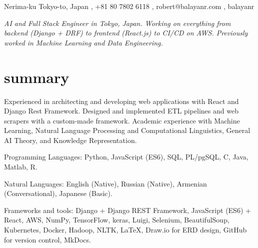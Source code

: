 \documentclass[]{cv-roald}
\begin{document}
\pagestyle{empty} %

{
\faMapMarker \hspace{\FAspace} Nerima-ku Tokyo-to, Japan \sep 
\faMobile \hspace{\FAspace} +81 80 7802 6118 \sep 
\href{mailto:robert@balayanr.com}{\faEnvelope} \hspace{\FAspace} robert@balayanr.com \sep 
\href{https://www.linkedin.com/in/balayanr/}{\faLinkedinSquare} \hspace{\FAspace} \href{https://github.com/balayanr}{\faGithub} \hspace{\FAspace} balayanr \FAspace  %
}


\textit{AI and Full Stack Engineer in Tokyo, Japan. Working on everything from backend (Django + DRF) to frontend (React.js) to CI/CD on AWS. Previously worked in Machine Learning and Data Engineering.}

\section*{summary}
\begin{tabitemize}
    \item Experienced in architecting and developing web applications with React and Django Rest Framework. Designed and implemented ETL pipelines and web scrapers with a custom-made framework. Academic experience with Machine Learning, Natural Language Processing and Computational Linguistics, General AI Theory, and Knowledge Representation.
    \item Programming Languages: Python, JavaScript (ES6), SQL, PL/pgSQL, C, Java, Matlab, R.
    \item Natural Languages: English (Native), Russian (Native), Armenian (Conversational), Japanese (Basic).
    \item Frameworks and tools: Django + Django REST Framework, JavaScript (ES6) + React, AWS, NumPy, TensorFlow, keras, Luigi, Selenium, BeautifulSoup, Kubernetes, Docker, Hadoop, NLTK, \LaTeX, Draw.io for ERD design, GitHub for version control, MkDocs.
\end{tabitemize}
\end{document}
